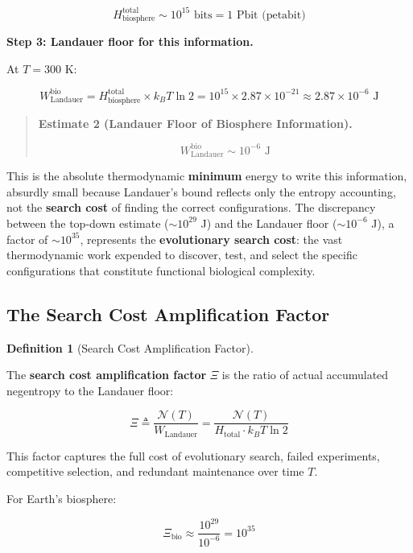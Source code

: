 \documentclass[11pt]{article}
\theoremstyle{plain}
\theoremstyle{definition}
\newtheorem{definition}{Definition}
\theoremstyle{remark}
\let\origsubsection\subsection
\renewcommand{\subsection}{\needspace{7\baselineskip}\origsubsection}
\begin{document}
\[H_{\text{biosphere}}^{\text{total}} \sim 10^{15} \text{ bits} = 1 \text{ Pbit (petabit)}\]

\textbf{Step 3: Landauer floor for this information.}

At \(T = 300\) K:

\[W_{\text{Landauer}}^{\text{bio}} = H_{\text{biosphere}}^{\text{total}} \times k_B T \ln 2 = 10^{15} \times 2.87 \times 10^{-21} \approx 2.87 \times 10^{-6} \text{ J}\]

\begin{quote}
\textbf{Estimate 2 (Landauer Floor of Biosphere Information).}

\[W_{\text{Landauer}}^{\text{bio}} \sim 10^{-6} \text{ J}\]
\end{quote}

This is the absolute thermodynamic \textbf{minimum} energy to write this
information, absurdly small because Landauer's bound reflects only the
entropy accounting, not the \textbf{search cost} of finding the correct
configurations. The discrepancy between the top-down estimate
(\(\sim 10^{29}\) J) and the Landauer floor (\(\sim 10^{-6}\) J), a
factor of \(\sim 10^{35}\), represents the \textbf{evolutionary search
cost}: the vast thermodynamic work expended to discover, test, and
select the specific configurations that constitute functional biological
complexity.

\subsection{The Search Cost Amplification
Factor}\label{the-search-cost-amplification-factor}

\begin{definition}[Search Cost Amplification Factor]
\label{def-search-cost-amplification}

The \textbf{search cost amplification factor} $\Xi$ is the ratio of actual accumulated negentropy to the Landauer floor:

$$\Xi \triangleq \frac{\mathcal{N}(T)}{W_{\text{Landauer}}} = \frac{\mathcal{N}(T)}{H_{\text{total}} \cdot k_B T \ln 2}$$

This factor captures the full cost of evolutionary search, failed experiments, competitive selection, and redundant maintenance over time $T$.
\end{definition}

For Earth's biosphere:

\[\Xi_{\text{bio}} \approx \frac{10^{29}}{10^{-6}} = 10^{35}\]
\end{document}
